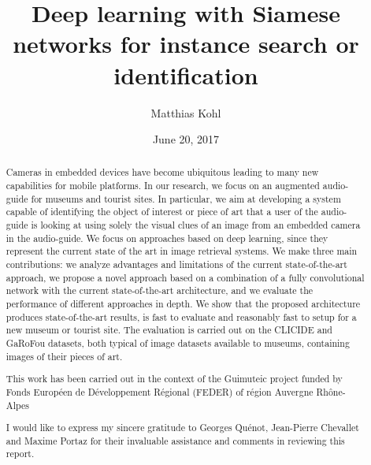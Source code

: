 \documentclass[12pt, a4paper]{memoir} %
\title{Deep learning with Siamese networks for instance search or identification} %
\author{Matthias Kohl}
\date{June 20, 2017} %
\begin{document}
\frontmatter
\begin{titlingpage}
\maketitle
\end{titlingpage}

\setlength{\parskip}{-1pt plus 1pt}

\renewcommand{\abstracttextfont}{\normalfont}
\abstractintoc
\begin{abstract}
Cameras in embedded devices have become ubiquitous leading to many new
capabilities for mobile platforms. In our research, we focus on an augmented
audio-guide for museums and tourist sites. In particular, we aim at
developing a system capable of identifying the object of interest or
piece of art that a user of the audio-guide is looking at using solely
the visual clues of an image from an embedded camera in the audio-guide.
We focus on approaches based on deep learning, since they represent the
current state of the art in image retrieval systems.
We make three main contributions:
we analyze advantages and limitations of the current state-of-the-art
approach, we propose a novel approach based on a combination of a fully
convolutional network with the current state-of-the-art architecture,
and we evaluate the performance of different approaches in depth.
We show that the proposed architecture produces state-of-the-art results,
is fast to evaluate and reasonably fast to setup for a new museum or
tourist site. The evaluation is carried out on the CLICIDE and GaRoFou
datasets, both typical of image datasets available to museums,
containing images of their pieces of art.
\end{abstract}
\abstractintoc

\renewcommand\abstractname{Acknowledgement}
\begin{abstract}
This work has been carried out in the context of the Guimuteic project
funded by Fonds Européen de Développement Régional (FEDER) of région
Auvergne Rhône-Alpes


I would like to express my sincere gratitude to Georges Quénot,
Jean-Pierre Chevallet and Maxime Portaz for their invaluable assistance
and comments in reviewing this report.
\end{abstract}
\end{document}
